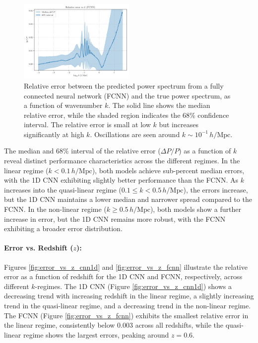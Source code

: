 \documentclass[twocolumn]{aastex631}
\begin{document}
\begin{figure}[h]
    \centering
    \includegraphics[width=0.5\textwidth]{plots/error_vs_k_fcnn_4_1745408320.png}
    \caption{\label{fig:error_vs_k_fcnn}Relative error between the predicted power spectrum from a fully connected neural network (FCNN) and the true power spectrum, as a function of wavenumber $k$. The solid line shows the median relative error, while the shaded region indicates the 68\% confidence interval. The relative error is small at low $k$ but increases significantly at high $k$. Oscillations are seen around $k \sim 10^{-1} \, h/\mathrm{Mpc}$.}
\end{figure}

The median and 68\% interval of the relative error ($\Delta P/P$) as a function of $k$ reveal distinct performance characteristics across the different regimes. In the linear regime ($k < 0.1\,h/\mathrm{Mpc}$), both models achieve sub-percent median errors, with the 1D CNN exhibiting slightly better performance than the FCNN. As $k$ increases into the quasi-linear regime ($0.1 \leq k < 0.5\,h/\mathrm{Mpc}$), the errors increase, but the 1D CNN maintains a lower median and narrower spread compared to the FCNN. In the non-linear regime ($k \geq 0.5\,h/\mathrm{Mpc}$), both models show a further increase in error, but the 1D CNN remains more robust, with the FCNN exhibiting a broader error distribution.

\paragraph{Error vs. Redshift ($z$):}

Figures \ref{fig:error_vs_z_cnn1d} and \ref{fig:error_vs_z_fcnn} illustrate the relative error as a function of redshift for the 1D CNN and FCNN, respectively, across different $k$-regimes. The 1D CNN (Figure \ref{fig:error_vs_z_cnn1d}) shows a decreasing trend with increasing redshift in the linear regime, a slightly increasing trend in the quasi-linear regime, and a decreasing trend in the non-linear regime. The FCNN (Figure \ref{fig:error_vs_z_fcnn}) exhibits the smallest relative error in the linear regime, consistently below 0.003 across all redshifts, while the quasi-linear regime shows the largest errors, peaking around $z=0.6$.
\end{document}
